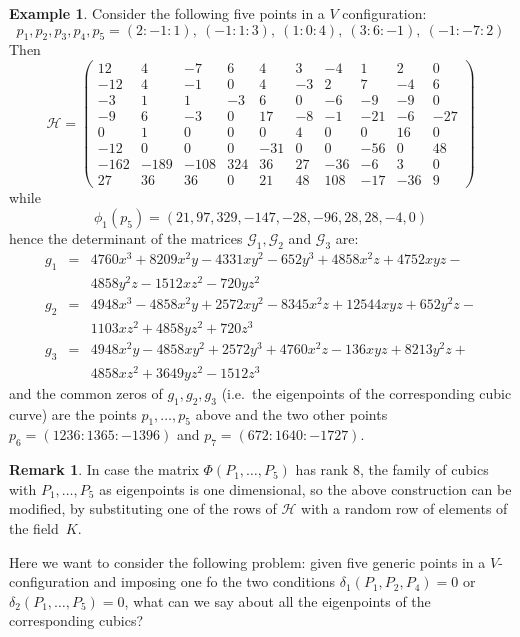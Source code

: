 \documentclass[12pt, a4paper, reqno, captions=tableheading,bibliography=totoc]{scrartcl}
\theoremstyle{plain}
\theoremstyle{definition}
\newtheorem{es}[lemma]{Example}
\newtheorem{rmk}[lemma]{Remark}
\begin{document}
\begin{es} Consider the following five points in a $V$ configuration:
\[
p_1, p_2, p_3, p_4, p_5 = (2: -1: 1), \ (-1: 1: 3), \ (1: 0: 4),\
(3: 6: -1), \ (-1: -7: 2)
\]
Then
\[
\mathcal{H} =
\left(\begin{array}{rrrrrrrrrr}
12 & 4 & -7 & 6 & 4 & 3 & -4 & 1 & 2 & 0 \\
-12 & 4 & -1 & 0 & 4 & -3 & 2 & 7 & -4 & 6 \\
-3 & 1 & 1 & -3 & 6 & 0 & -6 & -9 & -9 & 0 \\
-9 & 6 & -3 & 0 & 17 & -8 & -1 & -21 & -6 & -27 \\
0 & 1 & 0 & 0 & 0 & 4 & 0 & 0 & 16 & 0 \\
-12 & 0 & 0 & 0 & -31 & 0 & 0 & -56 & 0 & 48 \\
-162 & -189 & -108 & 324 & 36 & 27 & -36 & -6 & 3 & 0 \\
27 & 36 & 36 & 0 & 21 & 48 & 108 & -17 & -36 & 9
\end{array}\right)
\]
while
\[
\phi_1(p_5) = (21, 97, 329, -147, -28, -96, 28, 28, -4, 0)
\]
hence the determinant of the matrices $\mathcal{G}_1, \mathcal{G}_2$
and $\mathcal{G}_3$ are:
\begin{eqnarray*}
g_1 & = & 4760x^3 + 8209x^2y - 4331xy^2 - 652y^3 + 4858x^2z + 4752xyz - \\
& & 4858y^2z - 1512xz^2 - 720yz^2\\
g_2 & = & 4948x^3 - 4858x^2y + 2572xy^2 - 8345x^2z + 12544xyz + 652y^2z -\\
& & 1103xz^2 + 4858yz^2 + 720z^3\\
g_3 & = & 4948x^2y - 4858xy^2 + 2572y^3 + 4760x^2z - 136xyz + 8213y^2z + \\
& & 4858xz^2 + 3649yz^2 - 1512z^3
\end{eqnarray*}
and the common zeros of $g_1, g_2, g_3$ (i.e.\ the eigenpoints of the
corresponding cubic curve) are the points $p_1, \dots, p_5$
above and the two other points $p_6 = (1236: 1365: -1396)$ and
$p_7=(672: 1640: -1727)$.
\end{es}

\begin{rmk}
In case the matrix $\Phi(P_1, \dots, P_5)$ has rank $8$, the family of
cubics with $P_1, \dots, P_5$ as eigenpoints is one dimensional, so the
above construction can be modified, by substituting one of the rows of
$\mathcal{H}$ with a random row of elements of the field~$K$.
\end{rmk}

Here we want to consider the following problem:
given five generic points in a $V$-configuration and imposing one
fo the two conditions
$\delta_1(P_1, P_2, P_4) = 0$ or $\delta_2(P_1, \dots, P_5) = 0$, what
can we say about all the eigenpoints of the corresponding cubics?
\end{document}
